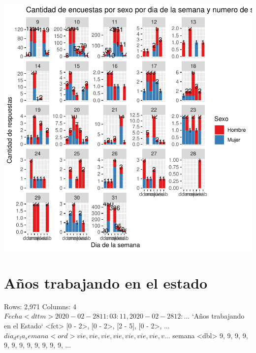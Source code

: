 \documentclass{article}
\begin{document}
\includegraphics{seguimientov5-036}


\section{Años trabajando en el estado}

\begin{Schunk}
\begin{Soutput}
Rows: 2,971
Columns: 4
$ Fecha                          <dttm> 2020-02-28 11:03:11, 2020-02-28 12:...
$ `Años trabajando en el Estado` <fct> [0 - 2>, [0 - 2>, [2 - 5], [0 - 2>, ...
$ dia_de_la_semana               <ord> vie, vie, vie, vie, vie, vie, vie, v...
$ semana                         <dbl> 9, 9, 9, 9, 9, 9, 9, 9, 9, 9, 9, 9, ...
\end{Soutput}
\end{Schunk}
\end{document}
